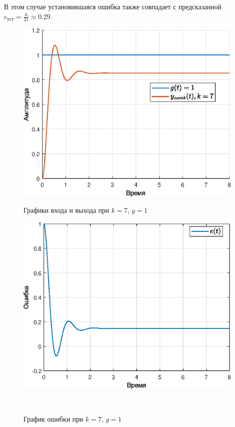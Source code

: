 \documentclass[a4paper]{article}
\begin{document}
В этом случае установившаяся ошибка также совпадает с предсказанной $e_{\text{уст}} =\frac{6}{21} \approx 0.29$.

\begin{figure}[H]
    \begin{minipage}{0.5\textwidth}
        \centering \includegraphics[width=\textwidth]{ex3/k7_g_a.eps}
        \caption{Графики входа и выхода при $k=7$, $g=1$}
    \end{minipage}\hfill
    \begin{minipage}{0.5\textwidth}
        \centering \includegraphics[width=\textwidth]{ex3/k7_g_a_error.eps}
        \caption{График ошибки при $k=7$, $g=1$}
    \end{minipage}\\[1em]
\end{figure}\noindent\
\end{document}
